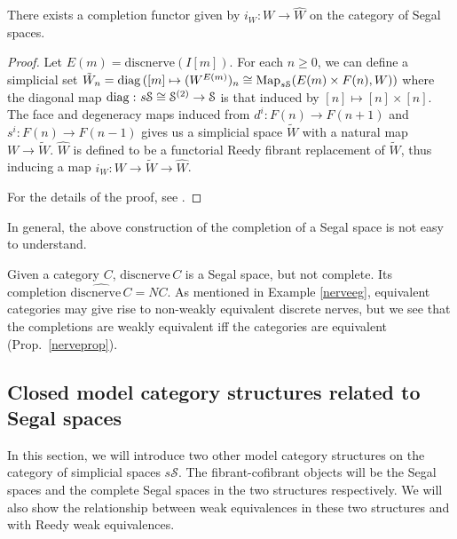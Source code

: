 \begin{refsection}
\begin{prop}
There exists a completion functor given by $i_W:W\to\hat W$ on the category of Segal spaces.
\end{prop}
\begin{proof}
Let $E(m)=\mathrm{discnerve}(I[m])$. For each $n \ge 0$, we can define a simplicial set $\tilde W_n=\operatorname{\mathrm{diag} \,}([m]\mapsto (W^{E(m)})_n \cong \operatorname{\mathrm{Map}}_{s\mathcal S}(E(m)\times F(n),W))$ where the diagonal map $\operatorname{\mathrm{diag} \,} \colon s\mathcal S\cong\mathcal S^{(2)}\to\mathcal S$ is that induced by $[n]\mapsto[n]\times[n]$. The face and degeneracy maps induced from $d^i \colon F(n)\to F(n+1)$ and $s^i \colon F(n)\to F(n-1)$ gives us a simplicial space $\tilde W$ with a natural map $W\to \tilde W$. $\hat W$ is defined to be a functorial Reedy fibrant replacement of $\tilde W$, thus inducing a map $i_W:W\to\tilde W\to\hat W$.

For the details of the proof, see \cite{rezk}.
\end{proof}

In general, the above construction of the completion of a Segal space is not easy to understand.

\begin{eg}\label{nervecomplete}
Given a category $C$, $\mathrm{discnerve}\,C$ is a Segal space, but not complete. Its completion $\widehat{\mathrm{discnerve}\,C}=NC$. As mentioned in Example \ref{nerveeg}, equivalent categories may give rise to non-weakly equivalent discrete nerves, but we see that the completions are weakly equivalent iff the categories are equivalent (Prop.~\ref{nerveprop}).
\end{eg}

\subsection{Closed model category structures related to Segal spaces}
In this section, we will introduce two other model category structures on the category of simplicial spaces $s\mathcal S$. The fibrant-cofibrant objects will be the Segal spaces and the complete Segal spaces in the two structures respectively. We will also show the relationship between weak equivalences in these two structures and with Reedy weak equivalences.


\end{refsection}
